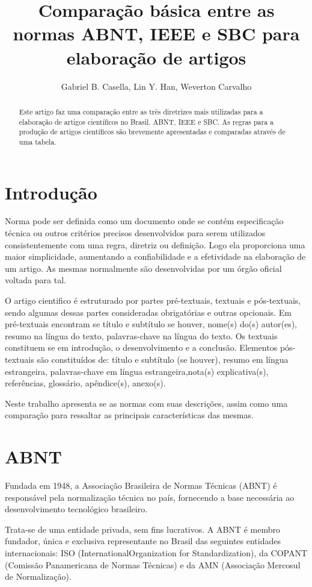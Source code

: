 \documentclass[12pt]{article}
\title{Comparação básica entre as normas ABNT, IEEE e SBC para elaboração de artigos}
\author{Gabriel B. Casella, Lin Y. Han, Weverton Carvalho}
\begin{document}
 

\maketitle

\begin{abstract}
Este artigo faz uma comparação entre as três diretrizes mais utilizadas para a elaboração de artigos científicos no Brasil. ABNT, IEEE e SBC. As regras para a produção de artigos científicos são brevemente apresentadas e comparadas através de uma tabela.
\end{abstract}

\section{Introdução}	
Norma pode ser definida como um documento onde se contém especificação técnica ou outros critérios precisos desenvolvidos para serem utilizados consistentemente com uma regra, diretriz ou definição. Logo ela proporciona uma maior simplicidade, aumentando a confiabilidade e a efetividade na elaboração de um artigo. As mesmas normalmente são desenvolvidas por um órgão oficial voltada para tal.

O artigo cientifico é estruturado  por partes pré-textuais, textuais e pós-textuais, sendo algumas dessas partes consideradas obrigatórias e outras opcionais. Em pré-textuais encontram se título e subtítulo se houver, nome(s) do(s) autor(es), resumo na língua do texto, palavras-chave na língua do texto. Os textuais constituem se em  introdução, o desenvolvimento e a conclusão. Elementos pós-textuais são constituídos de: título e subtítulo (se houver), resumo em língua estrangeira, palavras-chave em língua estrangeira,nota(s) explicativa(s), referências, glossário, apêndice(s), anexo(s).

Neste trabalho apresenta se as normas com suas descrições, assim como  uma comparação para ressaltar as principais características das mesmas.

\section{ABNT}
Fundada em 1948, a Associação Brasileira de Normas Técnicas (ABNT) é responsável pela normalização técnica no país, fornecendo a base necessária ao desenvolvimento tecnológico brasileiro\cite{ABNT:NBR6022}.

Trata-se de uma entidade privada, sem fins lucrativos. A ABNT é membro fundador, única e exclusiva representante no Brasil das seguintes entidades internacionais: ISO (InternationalOrganization for Standardization), da COPANT (Comissão Panamericana de Normas Técnicas) e da AMN (Associação Mercosul de Normalização)\cite{ABNT:NBR6022}.
\end{document}
